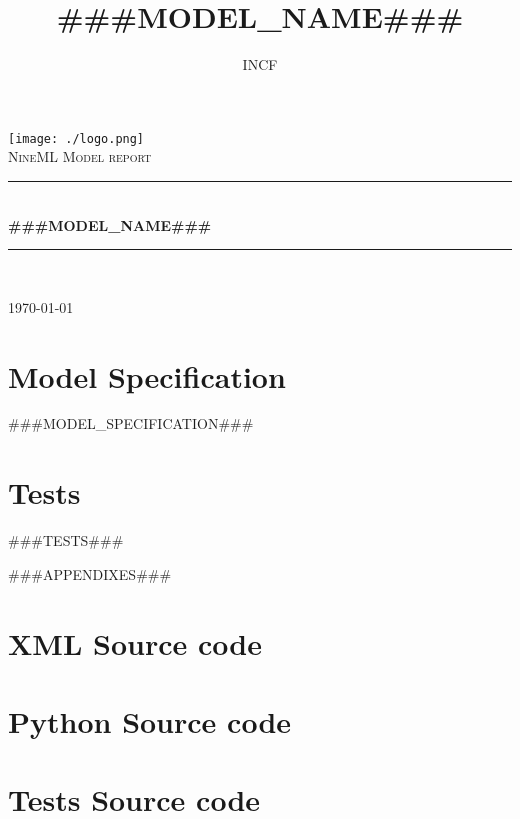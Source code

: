 \documentclass[a4paper]{article}
\title{###MODEL_NAME###}
\author{INCF}
\def\name{###MODEL_NAME###}
\newcommand{\HRule}{\rule{\linewidth}{0.2mm}}
\begin{document}
\begin{titlepage}
\begin{center}

\vspace*{5cm}

\texttt{[image: ./logo.png]} \\[1cm]    

\textsc{\Large NineML Model report}\\[0.5cm]

\HRule \\[0.4cm]
{ \huge \bfseries \name}\\[0.4cm]

\HRule \\[1.5cm]

\vfill

{\large \today}

\end{center}
\end{titlepage}
\newpage

\tableofcontents
\newpage

\section{Model Specification}

###MODEL_SPECIFICATION###
\newpage

\section{Tests}

###TESTS###
\newpage

\appendix

###APPENDIXES###

\section{XML Source code}

\section{Python Source code}

\section{Tests Source code}

\vfill
\end{document}
